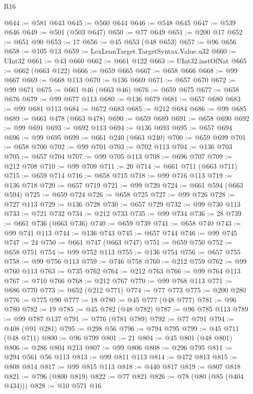 \begin{lexlean}{R16}
\begin{coremodule}
@644 := @581 @643
@645 := @560 @644
@646 := @548 @645
@647 := @539 @646
@649 := @501 (@503 @647)
@650 := @77 @649
@651 := @200 @17
@652 := @651 @90
@653 := 17
@656 := @45 @653 (@48 @653)
@657 := @96 @656
@658 := @105 @13
@659 := LexLeanTarget.TargetSyntax.Value.u32
@660 := UInt32
@661 := @43 @660
@662 := @661 @122
@663 := UInt32.instOfNat
@665 := @662 (@663 @122)
@666 := @659 @665
@667 := @658 @666
@668 := @99 @667
@669 := @668 @113
@670 := @136 @669
@671 := @657 @670
@672 := @99 @671
@675 := @661 @46 (@663 @46)
@676 := @659 @675
@677 := @658 @676
@679 := @99 @677 @113
@680 := @136 @679
@681 := @657 @680
@683 := @99 @681 @113
@684 := @672 @683
@685 := @212 @684
@686 := @99 @685
@689 := @661 @478 (@663 @478)
@690 := @659 @689
@691 := @658 @690
@692 := @99 @691
@693 := @692 @113
@694 := @136 @693
@695 := @657 @694
@696 := @99 @695
@699 := @661 @240 (@663 @240)
@700 := @659 @699
@701 := @658 @700
@702 := @99 @701
@703 := @702 @113
@704 := @136 @703
@705 := @657 @704
@707 := @99 @705 @113
@708 := @696 @707
@709 := @212 @708
@710 := @99 @709
@711 := 20
@714 := @661 @711 (@663 @711)
@715 := @659 @714
@716 := @658 @715
@718 := @99 @716 @113
@719 := @136 @718
@720 := @657 @719
@721 := @99 @720
@724 := @661 @594 (@663 @594)
@725 := @659 @724
@726 := @658 @725
@727 := @99 @726
@728 := @727 @113
@729 := @136 @728
@730 := @657 @729
@732 := @99 @730 @113
@733 := @721 @732
@734 := @212 @733
@735 := @99 @734
@736 := 28
@739 := @661 @736 (@663 @736)
@740 := @659 @739
@741 := @658 @740
@743 := @99 @741 @113
@744 := @136 @743
@745 := @657 @744
@746 := @99 @745
@747 := 24
@750 := @661 @747 (@663 @747)
@751 := @659 @750
@752 := @658 @751
@754 := @99 @752 @113
@755 := @136 @754
@756 := @657 @755
@758 := @99 @756 @113
@759 := @746 @758
@760 := @212 @759
@762 := @99 @760 @113
@763 := @735 @762
@764 := @212 @763
@766 := @99 @764 @113
@767 := @710 @766
@768 := @212 @767
@770 := @99 @768 @113
@771 := @686 @770
@773 := @652 (@212 @771)
@774 := @77 @773
@775 := @200 @280
@776 := @775 @90
@777 := 18
@780 := @45 @777 (@48 @777)
@781 := @96 @780
@782 := 19
@785 := @45 @782 (@48 @782)
@787 := @96 @785 @113
@789 := @99 @787 @137
@791 := @776 (@781 @789)
@792 := @77 @791
@794 := @408 (@91 @281)
@795 := @298 @56
@796 := @794 @795
@799 := @45 @711 (@48 @711)
@800 := @96 @799
@801 := 21
@804 := @45 @801 (@48 @801)
@806 := @286 @804 @213
@807 := @99 @806
@808 := @296 @795
@811 := @294 @561 @56 @113
@813 := @99 @811 @113
@814 := @472 @813
@815 := @808 @814
@817 := @99 @815 @113
@818 := @440 @817
@819 := @807 @818
@821 := @796 (@800 @819)
@822 := @77 @821
@826 := @78 (@80 (@85 (@404 @434)))
@828 := @10 @571 @16

\end{coremodule}
\end{lexlean}
